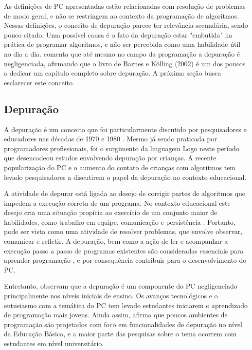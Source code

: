 As definições de PC apresentadas estão relacionadas com resolução de problemas de modo geral, e não se restringem ao contexto da programação de algoritmos. Nessas definições, o conceito de depuração parece ter relevância secundária, sendo pouco citado. Uma possível causa é o fato da depuração estar "embutida" na prática de programar algoritmos, e não ser percebida como uma habilidade útil no dia a dia.  comenta que até mesmo no campo da programação a depuração é negligenciada, afirmando que o livro de Barnes e Kölling (2002) é um dos poucos a dedicar um capítulo completo sobre depuração. A próxima seção busca esclarecer este conceito.

\subsection{Depuração}

A depuração é um conceito que foi particularmente discutido por pesquisadores e educadores nas décadas de 1970 \cite{mccauley_debugging_2008} e 1980 \cite{sipitakiat_robo-blocks_2012}. Mesmo já sendo praticada por programadores profissionais, foi o surgimento da linguagem Logo neste período que desencadeou estudos envolvendo depuração por crianças.  A recente popularização do PC e o aumento do contato de crianças com algoritmos tem levado pesquisadores a discutirem o papel da depuração no contexto educacional.

A atividade de depurar está ligada ao desejo de corrigir partes de algoritmos que impedem a execução correta de um programa. No contexto educacional este desejo cria uma situação propícia ao exercício de um conjunto maior de habilidades, como trabalho em equipe, comunicação e persistência \cite{sipitakiat_robo-blocks_2012}. Portanto, pode ser vista como uma atividade de resolver problemas, que envolve observar, comunicar e refletir. A depuração, bem como a ação de ler e acompanhar a execução passo a passo de programas existentes são consideradas essenciais para aprender programação \cite{mccauley_debugging_2008}, e por consequência contribuir para o desenvolvimento do \ac{PC}.

Entretanto,  observam que a depuração é um componente do PC negligenciado principalmente nos níveis iniciais de ensino. Os avanços tecnológicos e o entusiasmo com a temática do PC tem levado estudantes iniciarem o aprendizado de programação mais jovens. Ainda assim, afirma que poucos ambientes de programação são projetados com foco em funcionalidades de depuração no nível da Educação Básica, e a maior parte das pesquisas sobre o tema ocorrem com estudantes em nível universitário. 

